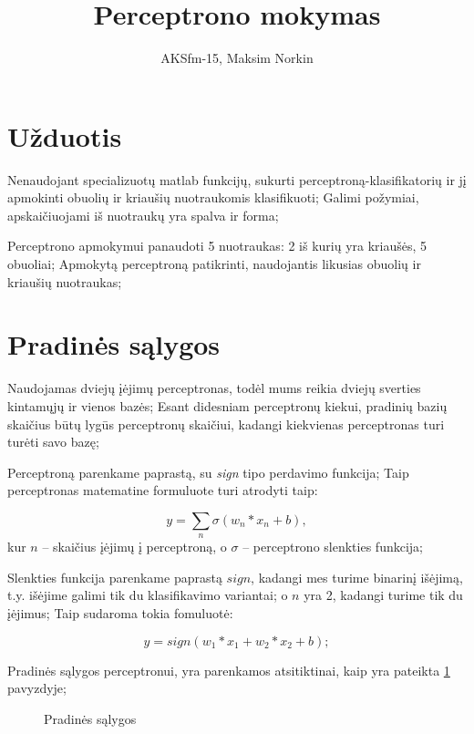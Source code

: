 \documentclass[11pt, a4paper, lithuanian]{article}
\author{AKSfm-15, Maksim Norkin}
\title{Perceptrono mokymas}
\begin{document}
    \maketitle

    \section{Užduotis}


        Nenaudojant specializuotų matlab funkcijų, sukurti perceptroną-klasifikatorių ir jį apmokinti obuolių ir kriaušių nuotraukomis klasifikuoti; Galimi požymiai, apskaičiuojami iš nuotraukų yra spalva ir forma;

        Perceptrono apmokymui panaudoti 5 nuotraukas: 2 iš kurių yra kriaušės, 5 obuoliai; Apmokytą perceptroną patikrinti, naudojantis likusias obuolių ir kriaušių nuotraukas;

    \section{Pradinės sąlygos}

        Naudojamas dviejų įėjimų perceptronas, todėl mums reikia dviejų sverties kintamųjų ir vienos bazės; Esant didesniam perceptronų kiekui, pradinių bazių skaičius būtų lygūs perceptronų skaičiui, kadangi kiekvienas perceptronas turi turėti savo bazę;

        Perceptroną parenkame paprastą, su \textit{sign} tipo perdavimo funkcija; Taip perceptronas matematine formuluote turi atrodyti taip:

        \begin{equation}
            y = \sum_{n} \sigma(w_n*x_n + b),
        \end{equation}
        kur $n$ -- skaičius įėjimų į perceptroną, o $\sigma$ -- perceptrono slenkties funkcija;

        Slenkties funkcija parenkame paprastą $sign$, kadangi mes turime binarinį išėjimą, t.y. išėjime galimi tik du klasifikavimo variantai; o $n$ yra 2, kadangi turime tik du įėjimus; Taip sudaroma tokia fomuluotė:

        \begin{equation}
            y = sign(w_1 * x_1 + w_2 * x_2 + b);
        \end{equation}

        Pradinės sąlygos perceptronui, yra parenkamos atsitiktinai, kaip yra pateikta \ref{code:pradines_salygos} pavyzdyje; 

        \begin{figure}[h]
            \centering
            \caption{Pradinės sąlygos}
            \label{code:pradines_salygos}
            
        \end{figure}
\end{document}
